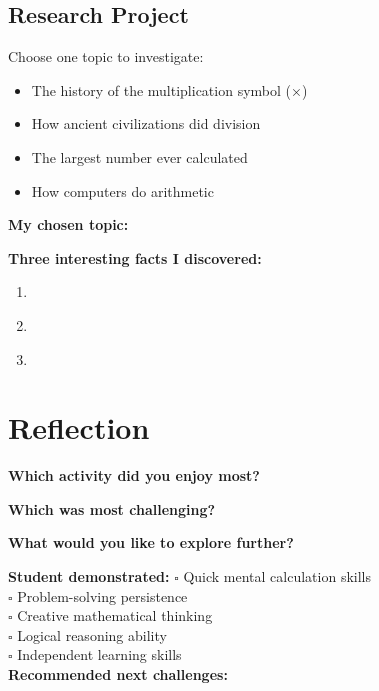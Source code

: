 \documentclass{article}
\begin{document}
\subsection*{Research Project}
Choose one topic to investigate:
\begin{itemize}
    \item The history of the multiplication symbol (×)
    \item How ancient civilizations did division
    \item The largest number ever calculated
    \item How computers do arithmetic
\end{itemize}

\textbf{My chosen topic:} \underline{\hspace{6cm}}

\textbf{Three interesting facts I discovered:}
\begin{enumerate}
    \item \underline{\hspace{10cm}}
    \item \underline{\hspace{10cm}}
    \item \underline{\hspace{10cm}}
\end{enumerate}

\section*{Reflection}
\textbf{Which activity did you enjoy most?} \underline{\hspace{6cm}}

\textbf{Which was most challenging?} \underline{\hspace{6cm}}

\textbf{What would you like to explore further?} \underline{\hspace{6cm}}

\vspace{1cm}

\begin{tcolorbox}[colback=green!10,colframe=green!60,title=Teacher Assessment Notes]
\textbf{Student demonstrated:}
$\square$ Quick mental calculation skills\\
$\square$ Problem-solving persistence\\
$\square$ Creative mathematical thinking\\
$\square$ Logical reasoning ability\\
$\square$ Independent learning skills\\

\textbf{Recommended next challenges:} \underline{\hspace{8cm}}
\end{tcolorbox}
\end{document}
